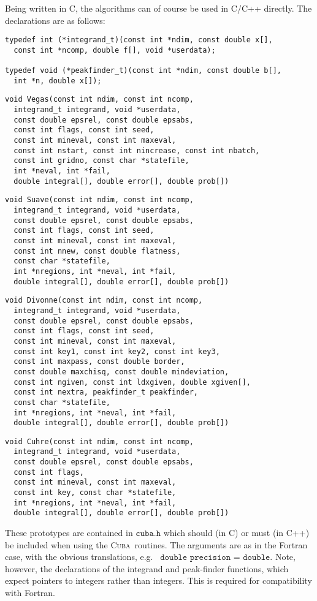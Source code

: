\documentclass[12pt]{article}
\newcommand\cuba{\textsc{Cuba}}
\newcommand\eg{e.g.\ }
\newcommand\Code[1]{\ensuremath{\texttt{#1}}}
\begin{document}
Being written in C, the algorithms can of course be used in C/C++ 
directly.  The declarations are as follows:
\begin{verbatim}
typedef int (*integrand_t)(const int *ndim, const double x[],
  const int *ncomp, double f[], void *userdata);

typedef void (*peakfinder_t)(const int *ndim, const double b[],
  int *n, double x[]);
\end{verbatim}
\begin{verbatim}
void Vegas(const int ndim, const int ncomp,
  integrand_t integrand, void *userdata,
  const double epsrel, const double epsabs,
  const int flags, const int seed,
  const int mineval, const int maxeval,
  const int nstart, const int nincrease, const int nbatch,
  const int gridno, const char *statefile,
  int *neval, int *fail,
  double integral[], double error[], double prob[])
\end{verbatim}
\begin{verbatim}
void Suave(const int ndim, const int ncomp,
  integrand_t integrand, void *userdata,
  const double epsrel, const double epsabs,
  const int flags, const int seed,
  const int mineval, const int maxeval,
  const int nnew, const double flatness,
  const char *statefile,
  int *nregions, int *neval, int *fail,
  double integral[], double error[], double prob[])
\end{verbatim}
\begin{verbatim}
void Divonne(const int ndim, const int ncomp,
  integrand_t integrand, void *userdata,
  const double epsrel, const double epsabs,
  const int flags, const int seed,
  const int mineval, const int maxeval,
  const int key1, const int key2, const int key3,
  const int maxpass, const double border,
  const double maxchisq, const double mindeviation,
  const int ngiven, const int ldxgiven, double xgiven[],
  const int nextra, peakfinder_t peakfinder,
  const char *statefile,
  int *nregions, int *neval, int *fail,
  double integral[], double error[], double prob[])
\end{verbatim}
\begin{verbatim}
void Cuhre(const int ndim, const int ncomp,
  integrand_t integrand, void *userdata,
  const double epsrel, const double epsabs,
  const int flags,
  const int mineval, const int maxeval,
  const int key, const char *statefile,
  int *nregions, int *neval, int *fail,
  double integral[], double error[], double prob[])
\end{verbatim}
These prototypes are contained in \Code{cuba.h} which should (in C) or
must (in C++) be included when using the \cuba\ routines.  The arguments
are as in the Fortran case, with the obvious translations, \eg
\Code{double precision} = \Code{double}.  Note, however, the
declarations of the integrand and peak-finder functions, which expect
pointers to integers rather than integers.  This is required for
compatibility with Fortran.
\end{document}
